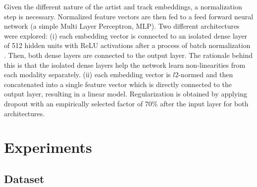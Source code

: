 Given the different nature of the artist and track embeddings, a normalization step is necessary. 
Normalized feature vectors are then fed to a feed forward neural network (a simple Multi Layer Perceptron, MLP). Two different architectures were explored: (i) each embedding vector is connected to an isolated dense layer of 512 hidden units with ReLU activations after a process of batch normalization \citep{IoffeS15}. Then, both dense layers are connected to the output layer. The rationale behind this is that the isolated dense layers help the network learn non-linearities from each modality separately. (ii) each embedding vector is $l2$-normed and then concatenated into a single feature vector which is directly connected to the output layer, resulting in a linear model.
Regularization is obtained by applying dropout with an empirically selected factor of 70\% after the input layer for both architectures.


\section{Experiments}\label{sec:cold-rec:experiments}

\subsection{Dataset}\label{sec:cold-rec:dataset}

